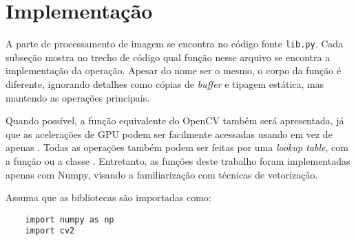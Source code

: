 \section{Implementação} \label{sec:impl}

A parte de processamento de imagem se encontra no código fonte \texttt{lib.py}. Cada subseção mostra no trecho de código qual função nesse arquivo se encontra a implementação da operação. Apesar do nome ser o mesmo, o corpo da função é diferente, ignorando detalhes como cópias de \textit{buffer} e tipagem estática, mas mantendo as operações principais.

Quando possível, a função equivalente do OpenCV também será apresentada, já que as acelerações de GPU podem ser facilmente acessadas usando  em vez de apenas  \autocite{ref:cvcuda}. Todas as operações também podem ser feitas por uma \textit{lookup table}, com a função  \autocite{ref:LUT} ou a classe  \autocite{ref:cudaLUT}. Entretanto, as funções deste trabalho foram implementadas apenas com Numpy, visando a familiarização com técnicas de vetorização.

\newpage

Assuma que as bibliotecas são importadas como:

\begin{verbatim}
    import numpy as np
    import cv2
\end{verbatim}











